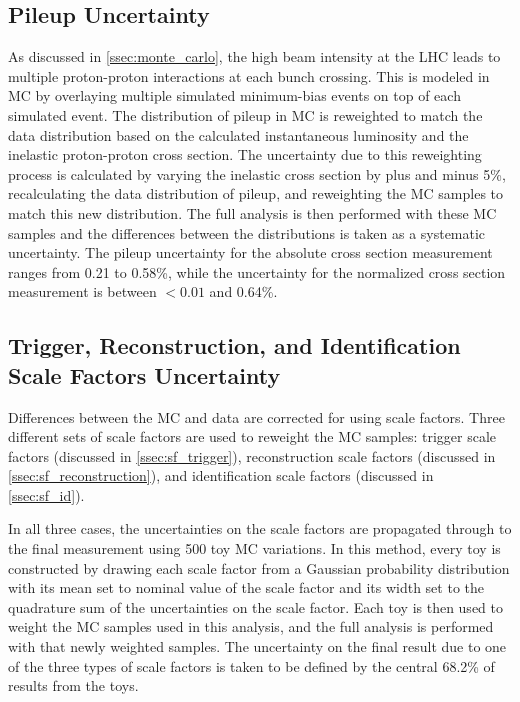 \subsection{Pileup Uncertainty}
\label{ssec:pileup_uncertainty}

As discussed in \cref{ssec:monte_carlo}, the high beam intensity at the LHC
leads to multiple proton-proton interactions at each bunch crossing. This is
modeled in MC by overlaying multiple simulated minimum-bias events on top of
each simulated event. The distribution of pileup in MC is reweighted to match
the data distribution based on the calculated instantaneous luminosity and the
inelastic proton-proton cross section. The uncertainty due to this reweighting
process is calculated by varying the inelastic cross section by plus and minus
5\%, recalculating the data distribution of pileup, and reweighting the MC
samples to match this new distribution. The full analysis is then performed
with these MC samples and the differences between the \phistar distributions is
taken as a systematic uncertainty. The pileup uncertainty for the absolute
cross section measurement ranges from 0.21 to 0.58\%, while the uncertainty for
the normalized cross section measurement is between $< 0.01$ and 0.64\%.

\subsection{Trigger, Reconstruction, and Identification Scale Factors Uncertainty}
\label{scale_factor_uncertainty}

Differences between the MC and data are corrected for using scale factors.
Three different sets of scale factors are used to reweight the MC samples:
trigger scale factors (discussed in \cref{ssec:sf_trigger}), reconstruction
scale factors (discussed in \cref{ssec:sf_reconstruction}), and
identification scale factors (discussed in \cref{ssec:sf_id}).

In all three cases, the uncertainties on the scale factors are propagated
through to the final measurement using 500 toy MC variations. In this method,
every toy is constructed by drawing each scale factor from a Gaussian
probability distribution with its mean set to nominal value of the scale factor
and its width set to the quadrature sum of the uncertainties on the scale
factor. Each toy is then used to weight the MC samples used in this analysis,
and the full analysis is performed with that newly weighted samples. The
uncertainty on the final result due to one of the three types of scale factors
is taken to be defined by the central 68.2\% of results from the toys.

